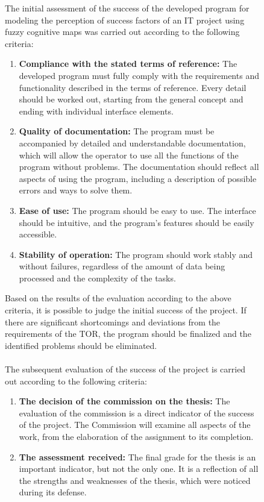 \documentclass{article}
\begin{document}
\begin{figure}[!t]
\begin{minipage}{0.49\textwidth}
            The initial assessment of the success of the developed program for modeling the perception of success factors of an IT project using fuzzy cognitive maps was carried out according to the following criteria:\\
            \begin{enumerate}
                \item \textbf{Compliance with the stated terms of reference:} The developed program must fully comply with the requirements and functionality described in the terms of reference. Every detail should be worked out, starting from the general concept and ending with individual interface elements.
                \item \textbf{Quality of documentation:} The program must be accompanied by detailed and understandable documentation, which will allow the operator to use all the functions of the program without problems. The documentation should reflect all aspects of using the program, including a description of possible errors and ways to solve them.
                \item \textbf{Ease of use:} The program should be easy to use. The interface should be intuitive, and the program's features should be easily accessible.
                \item \textbf{Stability of operation:} The program should work stably and without failures, regardless of the amount of data being processed and the complexity of the tasks.
            \end{enumerate}
            Based on the results of the evaluation according to the above criteria, it is possible to judge the initial success of the project. If there are significant shortcomings and deviations from the requirements of the TOR, the program should be finalized and the identified problems should be eliminated.\\
            ~\\
            The subsequent evaluation of the success of the project is carried out according to the following criteria:
            \begin{enumerate}
                \item \textbf{The decision of the commission on the thesis:} The evaluation of the commission is a direct indicator of the success of the project. The Commission will examine all aspects of the work, from the elaboration of the assignment to its completion.

                \item \textbf{The assessment received:} The final grade for the thesis is an important indicator, but not the only one. It is a reflection of all the strengths and weaknesses of the thesis, which were noticed during its defense.


\end{enumerate}
\end{minipage}
\end{figure}
\end{document}
